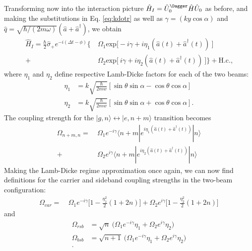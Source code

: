 Transforming now into the interaction picture $\hat{H}_I = \hat{U}_0^{\Dagger} \hat{H} \hat{U}_0$ as before, and making the substitutions in Eq. \ref{eq:kdotr} as well as $\gamma =( k y \cos \alpha )$ and $\hat{q} = \sqrt{\hbar / (2 m \omega)} (\hat{a} + \hat{a}^{\dagger})$, we obtain 
\begin{equation}
\begin{split}
\hat{H}_I = \frac{\hbar}{2} \hat{\sigma}_+ e^{-i (\Delta t - \phi) } \bigg\{& \ \Omega_1 \text{exp} \big[ -i \gamma + i \eta_1 ( \hat{a}(t) + \hat{a}^{\dagger}(t) ) \ \big] \\ 
+& \ \Omega_2 \text{exp} \big[ \ i \gamma + i \eta_2 ( \hat{a}(t) + \hat{a}^{\dagger}(t) ) \ \big] \bigg\} + \text{H.c.} \text{,}
\end{split}
\label{eq:HintSW}
\end{equation}
where $\eta_1$ and $\eta_2$ define respective Lamb-Dicke factors for each of the two beams:
\begin{equation}
\begin{split}
\eta_1 &= k \sqrt{ \frac{\hbar}{2 m w} }  [ \sin \theta \sin \alpha - \cos \theta \cos \alpha ] \\
\eta_2 &= k \sqrt{ \frac{\hbar}{2 m w} }  [ \sin \theta \sin \alpha + \cos \theta \cos \alpha ] \text{.}
\end{split}
\label{eq:etaSW}
\end{equation}
The coupling strength for the $|g,n\rangle \leftrightarrow |e,n+m\rangle$ transition becomes
\begin{equation}
\begin{split}
\Omega_{n+m, n} =& \ \Omega_1 e^{-i \gamma} \langle n + m | e^{ i \eta_1 ( \hat{a}(t) + \hat{a}^{\dagger}(t) ) } | n \rangle \\
+& \ \Omega_2 e^{i \gamma} \langle n + m | e^{ i \eta_2 ( \hat{a}(t) + \hat{a}^{\dagger}(t) ) } | n \rangle 
\label{eq:swRabiFreq}
\end{split}
\end{equation}
Making the Lamb-Dicke regime approximation once again, we can now find definitions for the carrier and sideband coupling strengths in the two-beam configuration:
\begin{equation}
\begin{split}
\Omega_{car} = \ &\Omega_1 e^{-i \gamma} \bigg[1 - \frac{\eta_1^2}{2}(1 + 2n) \bigg] + \Omega_2 e^{i \gamma} \bigg[1 - \frac{\eta_2^2}{2}(1 + 2n) \bigg] 
\label{eq:OmegaCarSW}
\end{split}
\end{equation}
and
\begin{equation}
\begin{split}
\Omega_{rsb} &= \sqrt{n} \ \big( \Omega_1 e^{-i \gamma} \eta_1 + \Omega_2 e^{i \gamma} \eta_2 \big) \\
\Omega_{bsb} &= \sqrt{n+1} \ \big( \Omega_1 e^{-i \gamma} \eta_1 + \Omega_2 e^{i \gamma} \eta_2 \big) \\ \text{.}
\end{split}
\label{eq:OmegaSbSW}
\end{equation}

